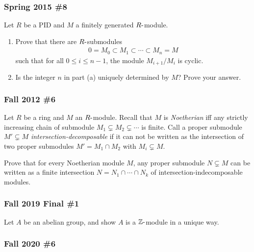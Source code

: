 \hypertarget{spring-2015-8}{%
\subsubsection{Spring 2015 \#8}\label{spring-2015-8}}

Let \(R\) be a PID and \(M\) a finitely generated \(R{\hbox{-}}\)module.

\begin{enumerate}
\def\labelenumi{\alph{enumi}.}
\item
  Prove that there are \(R{\hbox{-}}\)submodules
  \begin{align*}
  0 = M_0 \subset M_1 \subset \cdots \subset M_n = M
  \end{align*}
  such that for all \(0\leq i \leq n-1\), the module \(M_{i+1}/M_i\) is
  cyclic.
\item
  Is the integer \(n\) in part (a) uniquely determined by \(M\)? Prove
  your answer.
\end{enumerate}

\hypertarget{fall-2012-6}{%
\subsubsection{Fall 2012 \#6}\label{fall-2012-6}}

Let \(R\) be a ring and \(M\) an \(R{\hbox{-}}\)module. Recall that
\(M\) is \emph{Noetherian} iff any strictly increasing chain of
submodule \(M_1 \subsetneq M_2 \subsetneq \cdots\) is finite. Call a
proper submodule \(M' \subsetneq M\) \emph{intersection-decomposable} if
it can not be written as the intersection of two proper submodules
\(M' = M_1\cap M_2\) with \(M_i \subsetneq M\).

Prove that for every Noetherian module \(M\), any proper submodule
\(N\subsetneq M\) can be written as a finite intersection
\(N = N_1 \cap\cdots \cap N_k\) of intersection-indecomposable modules.

\hypertarget{fall-2019-final-1}{%
\subsubsection{Fall 2019 Final \#1}\label{fall-2019-final-1}}

Let \(A\) be an abelian group, and show \(A\) is a
\({\mathbb{Z}}{\hbox{-}}\)module in a unique way.

\hypertarget{fall-2020-6}{%
\subsubsection{Fall 2020 \#6}\label{fall-2020-6}}


